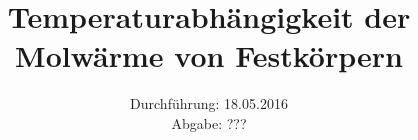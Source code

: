 

\subject{Versuch 47}
\title{Temperaturabhängigkeit der Molwärme von Festkörpern}
\date{Durchführung: 18.05.2016\\
      Abgabe: ???}



\maketitle
\newpage







\printbibliography


